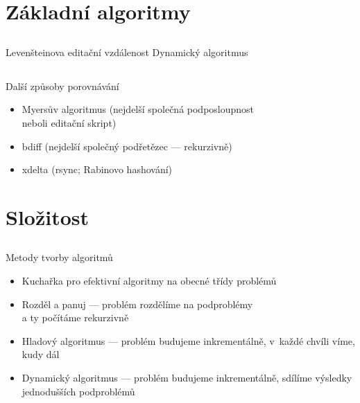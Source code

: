 \documentclass{beamer}
\begin{document}
\section{Základní algoritmy}

\subsection{}
\begin{frame}{Levenšteinova editační vzdálenost}
Dynamický algoritmus
\end{frame}

\subsection{}
\begin{frame}{Další způsoby porovnávání}
\begin{itemize}
\item Myersův algoritmus (nejdelší společná podposloupnost \\ neboli editační skript)
\item bdiff (nejdelší společný podřetězec --- rekurzivně)
\item xdelta (rsync; Rabinovo hashování)
\end{itemize}
\end{frame}

\section{Složitost}

\subsection{}
\begin{frame}{Metody tvorby algoritmů}
\begin{itemize}
\item Kuchařka pro efektivní algoritmy na obecné třídy problémů
\item Rozděl a panuj --- problém rozdělíme na podproblémy \\ a ty počítáme rekurzivně
\item Hladový algoritmus --- problém budujeme inkrementálně, v~každé chvíli víme, kudy dál
\item Dynamický algoritmus --- problém budujeme inkrementálně, sdílíme výsledky jednodušších podproblémů
\end{itemize}
\end{frame}
\end{document}
